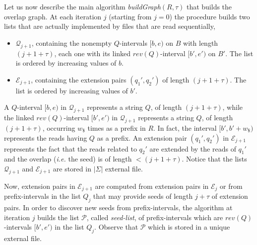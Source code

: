 \documentclass[runningheads,envcountsame,a4paper]{llncs}
\newcommand{\notaestesa}[2]{%
 \marginpar{\color{red!75!black}\textbf{\texttimes}}%
 {\color{red!75!black}%
 [\,\textbullet\,\textsf{\textbf{#1:}} %
 \textsf{\footnotesize#2}\,\textbullet\,]}%
}
\newcommand{\ie}{\textit{i.e.}\xspace}
\begin{document}
Let us now describe the main algorithm  \emph{buildGraph$(R, \tau)$} that
builds the overlap graph.
At each iteration $j$ (starting from $j=0$) the procedure builds  two  lists
that are actually implemented by files that are read sequentially,

\begin{itemize}
\item $\mathcal{Q}_{j+1}$, containing the nonempty $Q$-intervals $[b, e)$ on $B$ with length $(j+ 1 + \tau)$,
each one with its linked
  $rev(Q)$-interval $[b', e')$ on $B'$. The list is  ordered by increasing values of $b$.
\item $\mathcal{E}_{j +1}$, containing the extension pairs $(q_{1}', q_{2}')$ of
  length $(j+1 +\tau)$.  The list is ordered by increasing values of $b'$.

\end{itemize}

A $Q$-interval  $[b,e)$ in $\mathcal{Q}_{j+1}$ represents a
string $Q$, of length $(j+1 +\tau)$, while
the linked $rev(Q)$-interval  $[b',e')$ in $\mathcal{Q}_{j+1}$  represents a
string $Q$, of length $(j+1+ \tau)$, occurring $w_\$$ times as a prefix in $R$.
In fact,   the interval $[b',b'+w_\$)$ represents the reads having $Q$ as
a prefix. An extension pair $(q_{1}', q_{2}')$ in $\mathcal{E}_{j+1}$ represents the fact that the reads related to $q_{2}'$ are extended by the reads of $q_{1}'$ and the overlap (\ie the seed) is of length $<(j+1+\tau)$.
Notice that the lists $\mathcal{Q}_{j+1}$ and  $\mathcal{E}_{j+1}$ are stored in $|\Sigma|$ external file.

Now,  extension pairs in $\mathcal{E}_{j+1}$ are computed from extension pairs in  $\mathcal{E}_{j}$ or from prefix-intervals in the list $Q_j$ that may provide seeds of length $j + \tau$ of extension pairs. In order to discover new seeds from prefix-intervals, the algorithm at iteration $j$  builds the list $\mathcal{P}$, called {\em seed-list},  of prefix-intervals  which are $rev(Q)$-intervals $[b', e')$ in the list $Q_j$. Observe that  $\mathcal{P}$  which is  stored in a unique external file.



\end{document}
